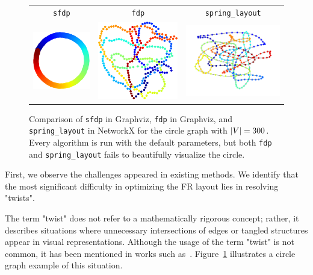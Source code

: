 \documentclass[dvipdfmx,lettersize,journal]{IEEEtran}
\begin{document}
\begin{figure}[t]
  \centering
  \begin{tabular}{ccc}
    \texttt{sfdp}                                             & \texttt{fdp} & \texttt{spring\_layout} \\
    \includegraphics[width=0.27\columnwidth]{circle_sfdp.png} &
    \includegraphics[width=0.27\columnwidth]{circle_fdp.png}  &
    \includegraphics[width=0.27\columnwidth]{circle_fr.png}                                            \\
  \end{tabular}
  \caption{
    Comparison of \texttt{sfdp} in Graphviz, \texttt{fdp} in Graphviz, and \texttt{spring\_layout} in NetworkX for the circle graph with $\abs{V} = 300$.
    Every algorithm is run with the default parameters, but both \texttt{fdp} and \texttt{spring\_layout} fails to beautifully visualize the circle.
  }
  \label{fig:circle}
\end{figure}

First, we observe the challenges appeared in existing methods.
We identify that the most significant difficulty in optimizing the FR layout lies in resolving "twists".

The term "twist" does not refer to a mathematically rigorous concept; rather, it describes situations where unnecessary intersections of edges or tangled structures appear in visual representations.
Although the usage of the term "twist" is not common, it has been mentioned in works such as~\cite{cheongSnapshotVisualizationComplex2018}. Figure~\ref{fig:circle} illustrates a circle graph example of this situation.
\end{document}
